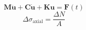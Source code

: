 \documentclass{article}
\begin{document}
\[\mathbf{M}\ddot{\mathbf{u}}+\mathbf{C}\dot{\mathbf{u}}+\mathbf{K}\mathbf{u}=\mathbf{F}(t)\]
\[\Delta\sigma_{\mathrm{axial}}=\frac{\Delta N}{A}\]
\end{document}
